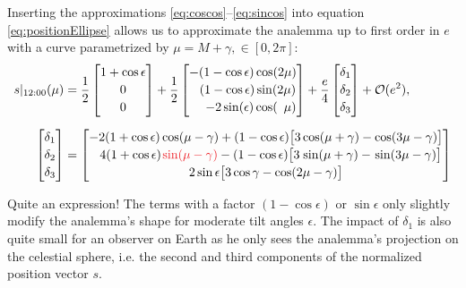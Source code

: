\documentclass[12pt]{article}
\newcommand{\Sin}{%
  \mathop{\sbox0{$\cos$}\makebox[\wd0][r]{$\sin$}}%
}
\begin{document}
Inserting the approximations \eqref{eq:coscos}--\eqref{eq:sincos} into
equation \eqref{eq:positionEllipse} allows us to approximate the analemma 
up to first order in $e$ with a curve parametrized by $\mu=M+\gamma, \in [0,2\pi]$:
\begin{align}
    s\vert_{12:00}(\mu) &=
    \frac{1}{2}
    \begin{bmatrix}
        1+\cos\epsilon\\[2pt]
        0\\[2pt]
        0
    \end{bmatrix}+
    \frac{1}{2}
    \begin{bmatrix}
        - (1-\cos\epsilon) \cos(2\mu)\\[2pt]
        \phantom{+} (1-\cos\epsilon) \sin(2\mu)\\[2pt]
        \quad\;-2\sin(\epsilon) \cos(\phantom{2}\mu)
    \end{bmatrix}
    + \frac{e}{4}
    \begin{bmatrix}
        \delta_1\\[2pt]
        \delta_2\\[2pt]
        \delta_3
    \end{bmatrix} + \mathcal{O}(e^2),\\[6pt]
    \begin{bmatrix}
        \delta_1\\[2pt]
        \delta_2\\[2pt]
        \delta_3
    \end{bmatrix} &=
    \begin{bmatrix}
        -2(1+\cos \epsilon) \cos(\mu-\gamma) + (1-\cos \epsilon) \big[
            3\cos(\mu+\gamma) - \cos(3\mu-\gamma)
        \big]\\[2pt]
        \phantom{-}4(1+\cos \epsilon)\textcolor{Red}{\Sin(\mu-\gamma)}
            -(1-\cos \epsilon) \big[
            3\Sin(\mu+\gamma) - \Sin(3\mu-\gamma)
        \big]\\[2pt]
        2\sin \epsilon \big[3\cos \gamma - \cos(2\mu-\gamma)\big]
    \end{bmatrix}
\end{align}

Quite an expression! The terms with a factor $(1-\cos\epsilon)$ or 
$\sin\epsilon$ only slightly modify the analemma's shape for moderate 
tilt angles $\epsilon$. The impact of $\delta_1$ is also quite small
for an observer on Earth as he only sees the analemma's projection on the
celestial sphere, i.e. the second and third components of the normalized
position vector $s$.
\end{document}
